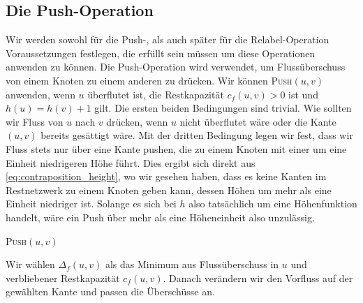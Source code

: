 \documentclass[12pt,a4paper,titlepage,onecolumn,ngerman,bibliography=totocnumbered]{scrartcl}
\theoremstyle{definition}
\theoremstyle{remark}
\begin{document}
\subsection{Die Push-Operation}
Wir werden sowohl für die Push-, als auch später für die Relabel-Operation Voraussetzungen festlegen, die erfüllt sein müssen um diese Operationen anwenden zu können.
Die Push-Operation wird verwendet, um Flussüberschuss von einem Knoten zu einem anderen zu drücken.
Wir können \textsc{Push}$(u,v)$ anwenden, wenn $u$ überflutet ist, die Restkapazität $c_f(u,v) > 0$ ist und $h(u) = h(v) + 1$ gilt.
Die ersten beiden Bedingungen sind trivial. 
Wie sollten wir Fluss von $u$ nach $v$ drücken, wenn $u$ nicht überflutet wäre oder die Kante $(u,v)$ bereits gesättigt wäre.
Mit der dritten Bedingung legen wir fest, dass wir Fluss stets nur über eine Kante pushen, die zu einem Knoten mit einer um eine Einheit niedrigeren Höhe führt.
Dies ergibt sich direkt aus \eqref{eq:contraposition_height}, wo wir gesehen haben, dass es keine Kanten im Restnetzwerk zu einem Knoten geben kann, dessen Höhen um mehr als eine Einheit niedriger ist.
Solange es sich bei $h$ also tatsächlich um eine Höhenfunktion handelt, wäre ein Push über mehr als eine Höheneinheit also unzulässig.
\begin{algorithm}[H]
    \caption{\textsc{Push}$(u,v)$}
    \label{alg:push}
\begin{algorithmic}[1]
\State{}
\Else
\EndIf
{}
\end{algorithmic}
\end{algorithm}
Wir wählen $\Delta_{f}(u,v)$ als das Minimum aus Flussüberschuss in $u$ und verbliebener Restkapazität $c_f(u,v)$.
Danach verändern wir den Vorfluss auf der gewählten Kante und passen die Überschüsse an.
\end{document}
